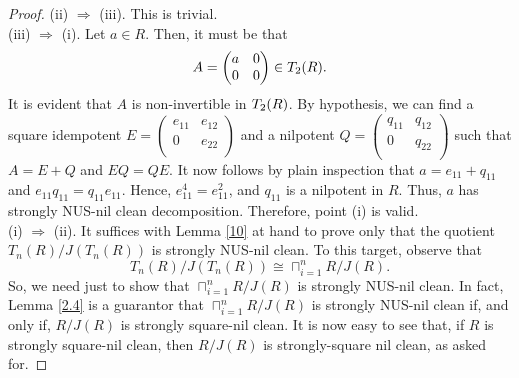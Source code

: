 \documentclass[10pt,a4paper]{amsart}
\begin{document}
\begin{proof}
(ii) $\Rightarrow$ (iii). This is trivial.\\
(iii) $\Rightarrow$ (i). Let $a\in R$. Then, it must be that
$$A=\begin{pmatrix}
	a & 0 \\
	0& 0 \\
\end{pmatrix}\in {\rm T}_2(R).$$ It is evident that $A$ is non-invertible in ${\rm T}_2(R)$. By hypothesis, we can find a square idempotent
$E=\begin{pmatrix}
	e_{11} &e_{12} \\
	0& e_{22}  \\
\end{pmatrix}$ and a nilpotent
$Q=\begin{pmatrix}
	q_{11} &q_{12} \\
	0& q_{22}  \\
\end{pmatrix}$ such that
$A=E+Q$ and $EQ=QE$. It now follows by plain inspection that $a=e_{11}+q_{11}$ and $e_{11}q_{11}=q_{11}e_{11}$. Hence, $e_{11}^4=e_{11}^2$, and $q_{11}$ is a nilpotent in $R$. Thus, $a$ has strongly NUS-nil clean decomposition. Therefore, point (i) is valid.\\
(i) $\Rightarrow$ (ii). It suffices with Lemma \ref{10} at hand to prove only that the quotient $T_n(R)/J(T_n(R))$ is strongly NUS-nil clean. To this target, observe that $$T_n(R)/J(T_n(R))\cong \sqcap_{i=1}^nR/J(R).$$ So, we need just to show that $\sqcap_{i=1}^nR/J(R)$ is strongly NUS-nil clean. In fact, Lemma \ref{2.4} is a guarantor that $\sqcap_{i=1}^nR/J(R)$ is strongly NUS-nil clean if, and only if, $R/J(R)$ is strongly square-nil clean. It is now easy to see that, if $R$ is strongly square-nil clean, then $R/J(R)$ is strongly-square nil clean, as asked for.
\end{proof}
\end{document}
